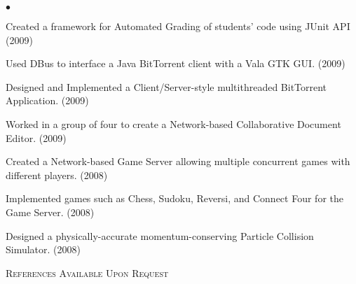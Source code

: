 \documentclass{article}
\newcommand{\lineunder} {
	\vspace*{-8pt} \\ \hspace*{-18pt} \hrulefill \\
}
\newcommand{\header}[1] {
	{\hspace*{-15pt}\vspace*{6pt} \textsc{#1}} \vspace*{-6pt} \lineunder
}
\newenvironment{achievements} {
	\begin{list}{$\bullet$}
		{\topsep 0pt \itemsep -2pt}
	}{
		\vspace*{4pt}\end{list}
	}
\begin{document}
	\begin{achievements}
		\item{Created a framework for Automated Grading of students' code using JUnit API (2009)}
		\item{Used DBus to interface a Java BitTorrent client with a Vala GTK GUI. (2009)}
		\item{Designed and Implemented a Client/Server-style multithreaded BitTorrent Application. (2009)}
		\item{Worked in a group of four to create a Network-based Collaborative Document Editor. (2009)}
		\item{Created a Network-based Game Server allowing multiple concurrent games with different players. (2008)}
		\item{Implemented games such as Chess, Sudoku, Reversi, and Connect Four for the Game Server. (2008)}
		\item{Designed a physically-accurate momentum-conserving Particle Collision Simulator. (2008)}
	\end{achievements}

\header{References Available Upon Request}
\end{document}
